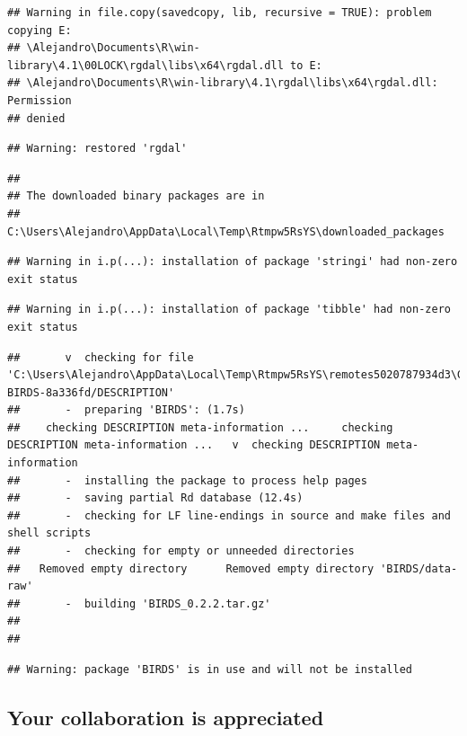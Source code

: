 \documentclass[
  10pt,
]{article}
\begin{document}
\begin{verbatim}
## Warning in file.copy(savedcopy, lib, recursive = TRUE): problem copying E:
## \Alejandro\Documents\R\win-library\4.1\00LOCK\rgdal\libs\x64\rgdal.dll to E:
## \Alejandro\Documents\R\win-library\4.1\rgdal\libs\x64\rgdal.dll: Permission
## denied
\end{verbatim}

\begin{verbatim}
## Warning: restored 'rgdal'
\end{verbatim}

\begin{verbatim}
## 
## The downloaded binary packages are in
##  C:\Users\Alejandro\AppData\Local\Temp\Rtmpw5RsYS\downloaded_packages
\end{verbatim}

\begin{verbatim}
## Warning in i.p(...): installation of package 'stringi' had non-zero exit status
\end{verbatim}

\begin{verbatim}
## Warning in i.p(...): installation of package 'tibble' had non-zero exit status
\end{verbatim}

\begin{verbatim}
##       v  checking for file 'C:\Users\Alejandro\AppData\Local\Temp\Rtmpw5RsYS\remotes5020787934d3\Greensway-BIRDS-8a336fd/DESCRIPTION'
##       -  preparing 'BIRDS': (1.7s)
##    checking DESCRIPTION meta-information ...     checking DESCRIPTION meta-information ...   v  checking DESCRIPTION meta-information
##       -  installing the package to process help pages
##       -  saving partial Rd database (12.4s)
##       -  checking for LF line-endings in source and make files and shell scripts
##       -  checking for empty or unneeded directories
##   Removed empty directory      Removed empty directory 'BIRDS/data-raw'
##       -  building 'BIRDS_0.2.2.tar.gz'
##      
## 
\end{verbatim}

\begin{verbatim}
## Warning: package 'BIRDS' is in use and will not be installed
\end{verbatim}

\hypertarget{your-collaboration-is-appreciated}{%
\subsection*{Your collaboration is appreciated}\label{your-collaboration-is-appreciated}}
\end{document}
